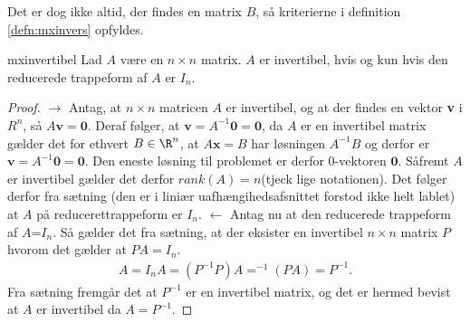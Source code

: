 %
%
Det er dog ikke altid, der findes en matrix $B$, så kriterierne i definition \ref{defn:mxinvers} opfyldes. 
%
\begin{thm}{}{mxinvertibel}
Lad $A$ være en $n \times n$ matrix. 
$A$ er invertibel, hvis og kun hvis den reducerede trappeform af $A$ er $I_n$.
\end{thm}
%
\begin{proof}
$\rightarrow$ Antag, at $n\times n$ matricen $A$ er invertibel, og at der findes en vektor \textbf{v} i $R^n$, så $A\textbf{v}=\textbf{0}$. 
Deraf følger, at $\textbf{v}=A^{-1}\textbf{0}=\textbf{0}$, da $A$ er en invertibel matrix gælder det for ethvert $B \in \R^n$, at $A\textbf{x}=B$ har løsningen $A^{-1}B$ og derfor er $\textbf{v}=A^{-1}\textbf{0}=\textbf{0}$. 
Den eneste løsning til problemet er derfor $0$-vektoren $\textbf{0}$. 
Såfremt $A$ er invertibel gælder det derfor $rank(A)=n$(tjeck lige notationen).
Det følger derfor fra sætning (den er i liniær uafhængihedsafsnittet forstod ikke helt lablet) at $A$ på reducerettrappeform er $I_n$.
$\leftarrow$
Antag nu at den reducerede trappeform af $A$=$I_n$. 
Så gælder det fra sætning, at der eksister en invertibel $n \times n$ matrix $P$ hvorom det gælder at $PA=I_n$. 
%
\begin{align*}
A=I_nA=(P^{-1}P)A=^{-1}(PA)=P^{-1}.
\end{align*}
%
Fra sætning fremgår det at $P^{-1}$ er en invertibel matrix, og det er hermed bevist at $A$ er invertibel da $A=P^{-1}$.
\end{proof}
